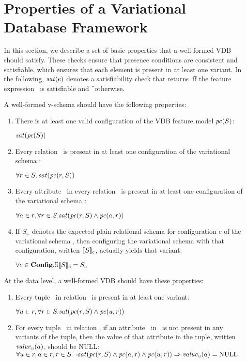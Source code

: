 \section{Properties of a Variational Database Framework}
\label{sec:vdbfprop}


In this section, we describe a set of basic properties that a well-formed VDB
should satisfy.
%
These checks ensure that presence conditions are consistent and satisfiable,
which ensures that each element is present in at least one variant.
%
In the following, $\sat\dimMeta$ denotes a satisfiability check
that returns \t\ if the feature expression \dimMeta\ is satisfiable and \f\
otherwise.


A well-formed v-schema should have the following properties:
%
\begin{enumerate}
%
\item There is at least one valid configuration of the VDB feature model $\getPC \vSch$:\\
%
\centerline{
$\sat {\getPC \vSch}$}
%
\item Every relation \vRel\ is present in at least one configuration of the
variational schema \vSch:\\
%
\centerline{
$\forall\vRel\in\vSch, \sat{\getPCfrom \vRel \vSch}$}
%
\item Every attribute \vAtt\ in every relation \vRel\ is present in at least one
configuration of the variational schema \vSch:\\
%
\centerline{
$\forall\vAtt\in\vRel, \forall\vRel\in\vSch.
\sat{\getPCfrom \vRel \vSch \wedge\getPCfrom \vAtt \vRel}$}
%
\item If $\vSch_\config$ denotes the expected plain relational schema for
configuration $c$ of the variational schema \vSch, then configuring the
variational schema with that configuration, written $\sem[\config]{\vSch}$,
actually yields that variant:\\
%
\centerline{
$\forall\config\in\confSet. \osSem {\vSch} = \vSch_\config$}
%
\end{enumerate}


\noindent
%
At the data level, a well-formed VDB should have these properties:
%
\begin{enumerate}
%
\item Every tuple \vTuple\ in relation \vRel\ is present in at least one variant:\\
%
\centerline{
$\forall\vTuple\in\vRel, \forall\vRel\in\vSch.
\sat{\getPCfrom\vRel \vSch\wedge\getPCfrom \vTuple \vRel}$ }
%
\item For every tuple \vTuple\ in relation \vRel, if an attribute \vAtt\ in \vRel\ is
not present in any variants of the tuple, then the value of that attribute in
the tuple, written $\mathit{value}_\vTuple(\vAtt)$, should be NULL:\\
$\forall\vTuple\in\vRel, \vAtt\in\vRel, \vRel\in\vSch.
\neg\sat{\getPCfrom \vRel \vSch \wedge\getPCfrom \vAtt \vRel\wedge\getPCfrom \vTuple \vRel}
\Rightarrow \mathit{value}_\vTuple(\vAtt) = \text{NULL}$
%
\end{enumerate}


